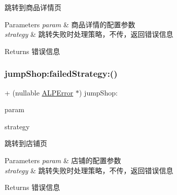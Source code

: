 跳转到商品详情页


\begin{DoxyParams}{Parameters}
{\em param} & 商品详情的配置参数 \\
\hline
{\em strategy} & 跳转失败时处理策略，不传，返回错误信息\\
\hline
\end{DoxyParams}
\begin{DoxyReturn}{Returns}
错误信息 
\end{DoxyReturn}
\mbox{\label{interface_a_l_p_t_b_link_partner_s_d_k_ad5c0623b62fb3f52dc6f73a0523036a2}} 
\subsubsection{\texorpdfstring{jump\+Shop\+:failed\+Strategy\+:()}{jumpShop:failedStrategy:()}}
{\footnotesize\ttfamily + (nullable \mbox{\hyperlink{interface_a_l_p_error}{A\+L\+P\+Error}} $\ast$) jump\+Shop\+: \begin{DoxyParamCaption}\item[{(nonnull \mbox{\hyperlink{interface_a_l_p_t_b_shop_param}{A\+L\+P\+T\+B\+Shop\+Param}} $\ast$)}]{param }\item[{failedStrategy:(nullable \mbox{\hyperlink{interface_a_l_p_jump_failed_strategy}{A\+L\+P\+Jump\+Failed\+Strategy}} $\ast$)}]{strategy }\end{DoxyParamCaption}}

跳转到店铺页


\begin{DoxyParams}{Parameters}
{\em param} & 店铺的配置参数 \\
\hline
{\em strategy} & 跳转失败时处理策略，不传，返回错误信息\\
\hline
\end{DoxyParams}
\begin{DoxyReturn}{Returns}
错误信息 
\end{DoxyReturn}
\mbox{\label{interface_a_l_p_t_b_link_partner_s_d_k_aa104ffde1663fbf4c88d6fddd705ddf6}} 
